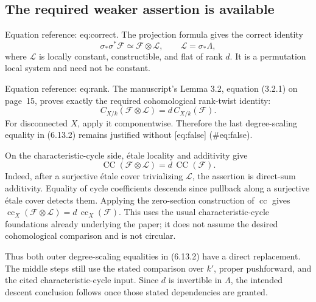 \documentclass[10pt]{article}
\begin{document}
\subsection*{The required weaker assertion is available}
Equation reference: eq:correct. The projection formula gives the correct identity \[
 \sigma_*\sigma^*\mathcal F\simeq\mathcal F\otimes\mathcal L,
 \qquad \mathcal L=\sigma_*\Lambda,\] where \(\mathcal L\) is locally constant, constructible, and flat of rank \(d\). It is a permutation local system and need not be constant.\par
Equation reference: eq:rank. The manuscript’s Lemma 3.2, equation (3.2.1) on page 15, proves exactly the required cohomological rank-twist identity: \[
 C_{X/k}(\mathcal F\otimes\mathcal L)=d\,C_{X/k}(\mathcal F).\] For disconnected \(X\), apply it componentwise. Therefore the last degree-scaling equality in (6.13.2) remains justified without [eq:false] (\#eq:false).\par
On the characteristic-cycle side, étale locality and additivity give \[\operatorname{CC}(\mathcal F\otimes\mathcal L)=d\,\operatorname{CC}(\mathcal F).\] Indeed, after a surjective étale cover trivializing \(\mathcal L\), the assertion is direct-sum additivity. Equality of cycle coefficients descends since pullback along a surjective étale cover detects them. Applying the zero-section construction of \(\operatorname{cc}\) gives \(\operatorname{cc}_X(\mathcal F\otimes\mathcal L)=d\,\operatorname{cc}_X(\mathcal F)\). This uses the usual characteristic-cycle foundations already underlying the paper; it does not assume the desired cohomological comparison and is not circular.\par
Thus both outer degree-scaling equalities in (6.13.2) have a direct replacement. The middle steps still use the stated comparison over \(k'\), proper pushforward, and the cited characteristic-cycle input. Since \(d\) is invertible in \(\Lambda\), the intended descent conclusion follows once those stated dependencies are granted.\par
\end{document}
